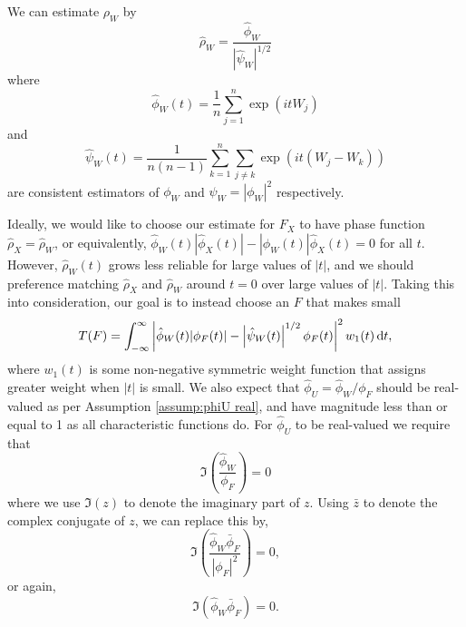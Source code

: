 	We can estimate $\rho_W$ by
	\begin{equation}
		\hat{\rho}_W = \frac{\hat{\phi}_W}{\left|\hat{\psi}_W\right|^{1/2}}
	\end{equation}
	where
	\begin{equation}
	\label{eq:define hat phi W}
		\hat{\phi}_W(t) = \frac{1}{n}\sum_{j = 1}^n \exp(it W_j)
	\end{equation}
	and 
	\begin{equation}
	\label{eq:define hat psi W}
		\hat{\psi}_W(t) = \frac{1}{n(n-1)} \sum_{k=1}^n \sum_{j \neq k} \exp(it (W_j - W_k))
	\end{equation}
	are consistent estimators of $\phi_W$ and $\psi_W = |\phi_W|^2$ respectively.

	Ideally, we would like to choose our estimate for $F_X$ to have phase function $\hat{\rho}_X = \hat{\rho}_W$, or equivalently, $\hat{\phi}_W(t) |\hat{\phi}_X(t)| - |\hat{\phi}_W(t)| \hat{\phi}_X(t) = 0$ for all $t$. 
	However, $\hat{\rho}_W(t)$ grows less reliable for large values of $|t|$, and we should preference matching $\hat{\rho}_X$ and $\hat{\rho}_W$ around $t = 0$ over large values of $|t|$. Taking this into consideration, our goal is to instead choose an $F$ that makes small
	\begin{equation}
		T(F) = \int_{-\infty}^\infty \left| \hat{\phi}_W(t) |\phi_F(t)| - \left|\hat{\psi}_W(t)\right|^{1/2} \phi_F(t) \right|^2 w_1(t) \, \mathrm{d} t,
	\end{equation}
	where $w_1(t)$ is some non-negative symmetric weight function that assigns greater weight when $|t|$ is small. We also expect that $\hat{\phi}_U = \hat{\phi}_W / \phi_F$ should be real-valued as per Assumption \ref{assump:phiU real}, and have magnitude less than or equal to 1 as all characteristic functions do. For $\hat{\phi}_U$ to be real-valued we require that
	\begin{equation}
		\Im \left( \frac{\hat{\phi}_W}{\phi_F} \right) = 0
	\end{equation}
	where we use $\Im(z)$ to denote the imaginary part of $z$. Using $\bar{z}$ to denote the complex conjugate of $z$, we can replace this by,
	\begin{equation}
		\Im \left(\frac{\hat{\phi}_W \bar{\phi}_F}{|\phi_F|^2} \right) = 0,
	\end{equation}
	or again,
	\begin{equation}
		\Im \left(\hat{\phi}_W \bar{\phi}_F\right) = 0.
	\end{equation}
